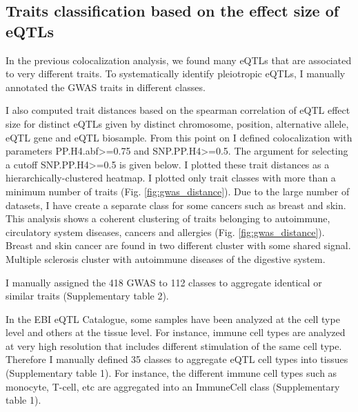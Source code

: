 %
\subsection*{Traits classification based on the effect size of eQTLs}
%

In the previous colocalization analysis, we found many eQTLs that are associated to very different traits.
%
To systematically identify pleiotropic eQTLs, I manually annotated the GWAS traits in different classes.

I also computed trait distances based on the spearman correlation of eQTL effect size for distinct eQTLs given by
distinct chromosome, position, alternative allele, eQTL gene and eQTL biosample.
%
From this point on I defined colocalization with parameters PP.H4.abf>=0.75 and SNP.PP.H4>=0.5.
%
The argument for selecting a cutoff SNP.PP.H4>=0.5 is given below.
%
I plotted these trait distances as a hierarchically-clustered heatmap.
%
I plotted only trait classes with more than a minimum number of traits (Fig. \ref{fig:gwas_distance}).
%
Due to the large number of datasets, I have create a separate class for some cancers such as breast and skin.
%
This analysis shows a coherent clustering of traits belonging to autoimmune, circulatory system diseases, cancers and allergies (Fig. \ref{fig:gwas_distance}).
%
Breast and skin cancer are found in two different cluster with some shared signal.
%
Multiple sclerosis cluster with autoimmune diseases of the digestive system.

I manually assigned the 418 GWAS to 112 classes to aggregate identical or similar traits (Supplementary table 2).

In the EBI eQTL Catalogue, some samples have been analyzed at the cell type level and others at the tissue level.
%
For instance, immune cell types are analyzed at very high resolution that includes different stimulation of the same cell type.
%
Therefore I manually defined 35 classes to aggregate eQTL cell types into tissues (Supplementary table 1).
%
For instance, the different immune cell types such as monocyte, T-cell, etc are aggregated into an ImmuneCell class (Supplementary table 1).

